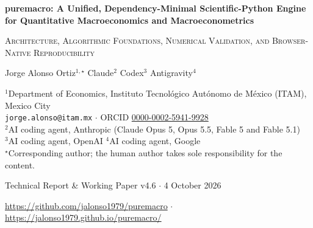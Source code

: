 \documentclass[11pt,letterpaper]{article}
\renewcommand{\_}{\pmunderscore\allowbreak}
\begin{document}
\begin{titlepage}
\begin{center}
\vspace*{-0.6cm}
{\huge\bfseries\color{navy} puremacro: A Unified, Dependency-Minimal Scientific-Python Engine for Quantitative Macroeconomics and Macroeconometrics\par}
\vspace{0.35cm}
{\large\scshape Architecture, Algorithmic Foundations, Numerical Validation, and Browser-Native Reproducibility\par}
\vspace{0.6cm}
{\Large Jorge Alonso Ortiz$^{1,\star}$ \quad Claude$^{2}$ \quad Codex$^{3}$ \quad Antigravity$^{4}$\par}
\vspace{0.4cm}
{\small
$^{1}$Department of Economics, Instituto Tecnológico Autónomo de México (ITAM), Mexico City\\
\texttt{jorge.alonso@itam.mx} $\cdot$ ORCID \href{https://orcid.org/0000-0002-5941-9928}{0000-0002-5941-9928}\\[2pt]
$^{2}$AI coding agent, Anthropic (Claude Opus 5, Opus 5.5, Fable 5 and Fable 5.1)\\
$^{3}$AI coding agent, OpenAI \quad $^{4}$AI coding agent, Google\\[2pt]
$^{\star}$Corresponding author; the human author takes sole responsibility for the content.\par}
\vspace{0.45cm}
{\large Technical Report \& Working Paper v4.6 $\cdot$ 4 October 2026\par}
\vspace{0.25cm}
{\small \url{https://github.com/jalonso1979/puremacro} $\cdot$ \url{https://jalonso1979.github.io/puremacro/}\par}
\end{center}
\vspace{0.3cm}
\begin{tcolorbox}[colback=lightslate,colframe=navy,boxrule=0.8pt,arc=3mm,title={\bfseries Abstract},
  fonttitle=\color{white}\bfseries,colbacktitle=navy,fontupper=\small]

\end{tcolorbox}
\end{titlepage}
\end{document}
